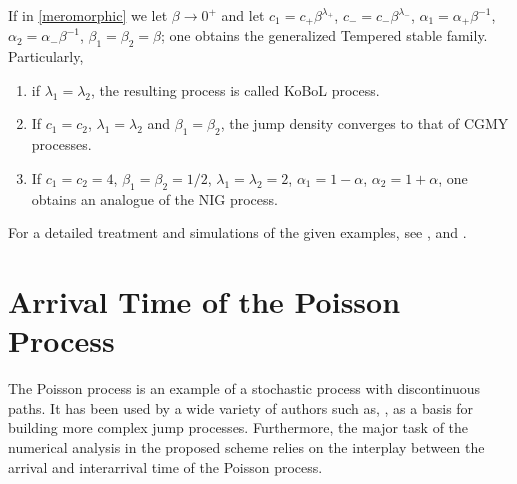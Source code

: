 \begin{example}
If in \eqref{meromorphic} we let $\beta \to 0^+$ and let $c_1 = c_+ \beta^{\lambda_+}$, $c_- = c_-\beta^{\lambda_-}$, $\alpha_1 = \alpha_+ \beta^{-1}$,  $\alpha_2 = \alpha_- \beta^{-1}$, $\beta_1 = \beta_2 = \beta$; one obtains the generalized Tempered stable family. Particularly,
\begin{enumerate}[label=(\roman*)]
    \item if $\lambda_{1} = \lambda_{2}$, the resulting process is called KoBoL process. 
    \item If $c_1 = c_2$, $\lambda_{1} = \lambda_{2}$ and $ \beta_1 =  \beta_2$, the jump density converges to that of CGMY processes.
    \item If $c_1 = c_2 = 4$, $ \beta_1 =  \beta_2 = 1/2$,  $\lambda_{1} = \lambda_2 = 2$, $\alpha_1 = 1- \alpha$, $\alpha_2 = 1 + \alpha$, one obtains an analogue of the NIG process. 
\end{enumerate}
\begin{remark}
For a detailed treatment and simulations of the given examples, see  ,  and .
\end{remark}

\end{example}
\section{Arrival Time of the Poisson Process}\label{Section2_2}
The Poisson process is an example of a stochastic process with discontinuous paths. It has been used by a wide variety of authors such as, , as a basis for building more complex jump processes. Furthermore, the major task of the numerical analysis in the proposed scheme relies on the interplay between the arrival and interarrival time of the Poisson process.

